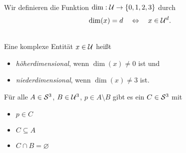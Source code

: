 \begin{dfn}\ \\
    Wir definieren die Funktion $\dim : \mathcal{U} \to \{0,1,2,3\}$ durch
    $$\dim(x) = d \quad \Leftrightarrow \quad x \in \mathcal{U}^d.$$
\end{dfn}

\begin{dfn}\ \\
    Eine komplexe Entität $x \in \mathcal{U}$ heißt
    \begin{itemize}
        \item \emph{höherdimensional}, wenn $\dim(x) \neq 0$ ist und
        \item \emph{niederdimensional}, wenn $\dim(x) \neq 3$ ist.
    \end{itemize}
\end{dfn}

\begin{satz}\label{satz:strong-sup-pre}
    Für alle $A \in \mathcal{S}^3$, $B \in \mathcal{U}^3$, $p \in A \setminus B$ gibt es ein $C \in \mathcal{S}^3$ mit
    \begin{itemize}
        \item $p \in C$
        \item $C \subseteq A$
        \item $C \cap B = \varnothing$
    \end{itemize}
\end{satz}

